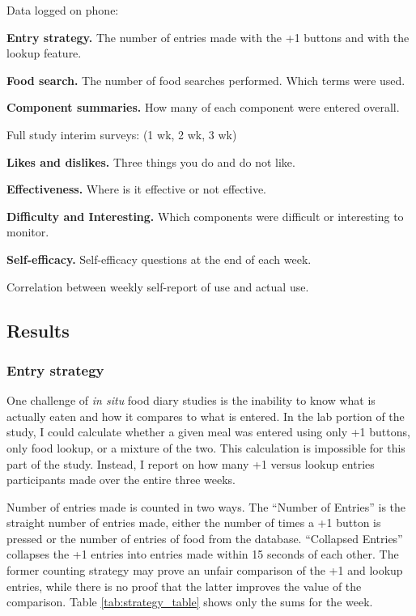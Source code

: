 \begin{enumerate*}
\item Data logged on phone: 
\begin{itemize*}
\item \textbf{Entry strategy.} The number of entries made with the +1 buttons and with the lookup feature. 
\item \textbf{Food search.} The number of food searches performed. Which terms were used. 
\item \textbf{Component summaries. } How many of each component were entered overall. 
\end{itemize*}
\item Full study interim surveys:  (1 wk, 2 wk, 3 wk)
\begin{itemize*}
\item \textbf{Likes and dislikes.} Three things you do and do not like.
\item \textbf{Effectiveness. } Where is it effective or not effective.
\item \textbf{Difficulty and Interesting. }  Which components were difficult or interesting to monitor.
\item \textbf{Self-efficacy.} Self-efficacy questions at the end of each week. 
\end{itemize*}
\item Correlation between weekly self-report of use and actual use. 
\end{enumerate*}

\subsection{Results}


\subsubsection{Entry strategy}
One challenge of \textit{in situ} food diary studies is the inability to know what is actually eaten and how it compares to what is entered. In the lab portion of the study, I could calculate whether a given meal was entered using only +1 buttons, only food lookup, or a mixture of the two. This calculation is impossible for this part of the study. Instead, I report on how many +1 versus lookup entries participants made over the entire three weeks. 

Number of entries made is counted in two ways. The ``Number of Entries'' is the straight number of entries made, either the number of times a +1 button is pressed or the number of entries of food from the database. ``Collapsed Entries'' collapses the +1 entries into entries made within 15 seconds of each other. The former counting strategy may prove an unfair comparison of the +1 and lookup entries, while there is no proof that the latter improves the value of the comparison. Table  \ref{tab:strategy_table} shows only the sums for the week. 

